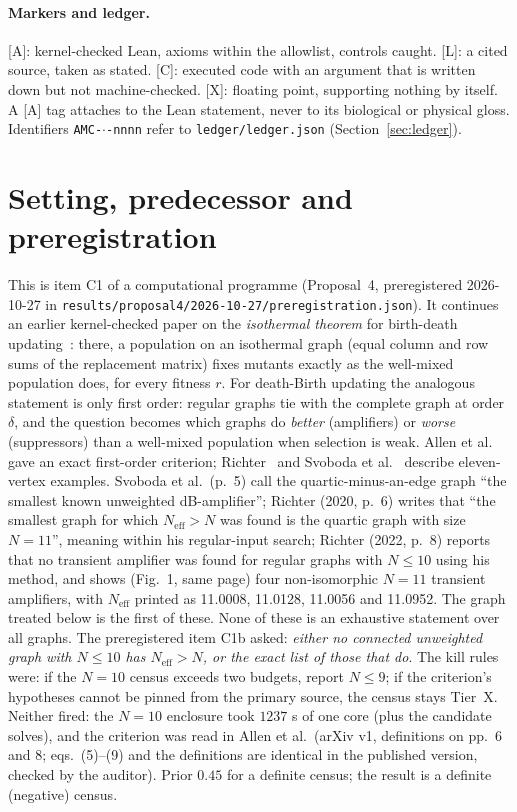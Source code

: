 \documentclass[10pt]{article}
\newcommand{\tier}[1]{\textsf{[#1]}}
\newcommand{\tA}{\tier{A}}
\newcommand{\tL}{\tier{L}}
\newcommand{\tC}{\tier{C}}
\newcommand{\tX}{\tier{X}}
\newcommand{\Neff}{N_{\mathrm{eff}}}
\begin{document}
\paragraph{Markers and ledger.} \tA{}: kernel-checked Lean, axioms within the allowlist, controls caught. \tL{}: a cited source, taken
as stated. \tC{}: executed code with an argument that is written down but not machine-checked. \tX{}: floating point, supporting
nothing by itself. A \tA{} tag attaches to the Lean statement, never to its biological or physical gloss. Identifiers
\texttt{AMC-$\cdot$-nnnn} refer to \texttt{ledger/ledger.json} (Section~\ref{sec:ledger}).

\section{Setting, predecessor and preregistration}\label{sec:setting}
This is item C1 of a computational programme (Proposal~4, preregistered 2026-10-27 in \texttt{results/proposal4/2026-10-27/preregistration.json}).
It continues an earlier kernel-checked paper on the \emph{isothermal theorem} for birth-death updating~\cite{iso}: there, a
population on an isothermal graph (equal column and row sums of the replacement matrix) fixes mutants exactly as the well-mixed population does, for
every fitness $r$. For death-Birth updating the analogous statement is only first order: regular graphs tie with the complete
graph at order $\delta$, and the question becomes which graphs do \emph{better} (amplifiers) or \emph{worse} (suppressors) than a
well-mixed population when selection is weak. Allen et al.~\cite{allen} gave an exact first-order criterion; Richter~\cite{rich20,rich22}
and Svoboda et al.~\cite{svo} describe eleven-vertex examples. Svoboda et al.\ (p.~5) call the quartic-minus-an-edge graph ``the smallest known unweighted dB-amplifier'';
Richter (2020, p.~6) writes that ``the smallest graph for which $N_{\mathrm{eff}}>N$ was found is the quartic graph with size $N=11$'', meaning within his
regular-input search; Richter (2022, p.~8) reports that no transient amplifier was found for regular graphs with $N\le10$ using his method, and shows (Fig.~1, same page) four non-isomorphic $N=11$ transient amplifiers, with $N_{\mathrm{eff}}$ printed as 11.0008, 11.0128, 11.0056 and 11.0952. The graph treated below is the first of these. None of these is an
exhaustive statement over all graphs. The preregistered item C1b asked: \emph{either no connected unweighted graph with $N\le10$ has $\Neff>N$, or the
exact list of those that do}. The kill rules were: if the $N=10$ census exceeds two budgets, report $N\le9$; if the criterion's hypotheses
cannot be pinned from the primary source, the census stays Tier~X. Neither fired: the $N=10$ enclosure took $1237$ s of one core (plus the candidate solves), and
the criterion was read in Allen et al.\ (arXiv v1, definitions on pp.~6 and 8; eqs.~(5)--(9) and the definitions are identical in the published version, checked by the auditor). Prior $0.45$ for a definite census; the result is a definite
(negative) census.
\end{document}
